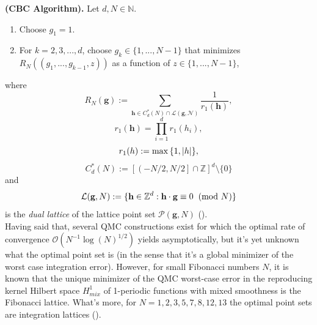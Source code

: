\begin{Algorithm} \label{CBC}
     \textbf{(CBC Algorithm).} Let $d,N \in \mathbb{N}$.
     \begin{enumerate}
         \item Choose $g_1 = 1$.
         \item For $k=2,3,...,d$, choose $g_k \in \{ 1,...,N-1 \}$ that minimizes $R_N((g_1,...,g_{k-1},z))$ as a function of $z \in \{ 1,...,N-1 \}$, 
     \end{enumerate}
\end{Algorithm}
where
\begin{equation*}
    R_N(\textbf{g}) := \sum_{\textbf{h}\in C_d^*(N)\cap \mathcal{L(\textbf{g},N)}} \frac{1}{r_1(\textbf{h})},
\end{equation*}
\begin{equation*}
    r_1(\textbf{h}) = \prod_{i=1}^d r_1(h_i),
\end{equation*}
\begin{equation*}
    r_1(h) := \max{\{1,\lvert h\rvert\}},
\end{equation*}
\begin{equation*}
    C_d^*(N) := \left[ \left( -N/2,N/2 \right] \cap \mathbb{Z} \right]^d\setminus\{0\}
\end{equation*}
and
\begin{equation*}
    \mathcal{L}(\textbf{g},N) := \{ \textbf{h} \in \mathbb{Z}^d : \textbf{h} \cdot \textbf{g} \equiv 0 \hspace{2mm} (\text{mod } N) \}
\end{equation*}
is the \textit{dual lattice} of the lattice point set $\mathcal{P}(\textbf{g},N)$ (\cite{Leobacher_Pillichshammer___2013___Introduction_to_Quasi_Montecarlo_Methods.pdf}).\\

Having said that, several QMC constructions exist for which the optimal rate of convergence $\mathcal{O}(N^{-1}\log(N)^{1/2})$ yields asymptotically, but it's yet unknown what the optimal point set is (in the sense that it's a global minimizer of the worst case integration error). However, for small Fibonacci numbers $N$, it is known that the unique minimizer of the QMC worst-case error in the reproducing kernel Hilbert space $H_{mix}^1$ of 1-periodic functions with mixed smoothness is the Fibonacci lattice. What's more, for $N=1,2,3,5,7,8,12,13$ the optimal point sets are integration lattices (\cite{Hinrichs.pdf}).\\






